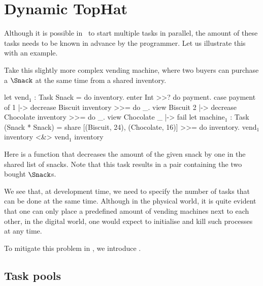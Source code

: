 
\section{Dynamic TopHat}
\label{sec:dyntophat}


Although it is possible in \TOPHAT\ to start multiple tasks in parallel,
the amount of these tasks needs to be known in advance by the programmer.
Let us illustrate this with an example.

\begin{example}
  \label{exm:vending-shared}
  Take this slightly more complex vending machine,
  where two buyers can purchase a $\Snack$ at the same time from a shared inventory.

  \begin{TASK}[emph={inventory,payment}]
    let vend$_1$ : Task Snack = do inventory.
      enter Int >>? do payment.
      case payment of
        1 |-> decrease Biscuit inventory >>= do _.
             view Biscuit
        2 |-> decrease Chocolate inventory >>= do _.
             view Chocolate
        _ |-> fail
    let machine$_1$ : Task (Snack * Snack) =
      share [(Biscuit, 24), (Chocolate, 16)] >>= do inventory.
      vend$_1$ inventory <&> vend$_1$ inventory
  \end{TASK}

  Here  is a function that decreases the amount of the given snack by one in the shared list of snacks.
  Note that this task results in a pair containing the two bought $\Snack$s.

  We see that, at development time, we need to specify the number of  tasks that can be done at the same time.
  Although in the physical world, it is quite evident that one can only place a predefined amount of vending machines next to each other,
  in the digital world, one would expect to initialise and kill such processes at any time.
\end{example}

To mitigate this problem in \TOPHAT,
we introduce \DYNTOPHAT.


\subsection{Task pools}

